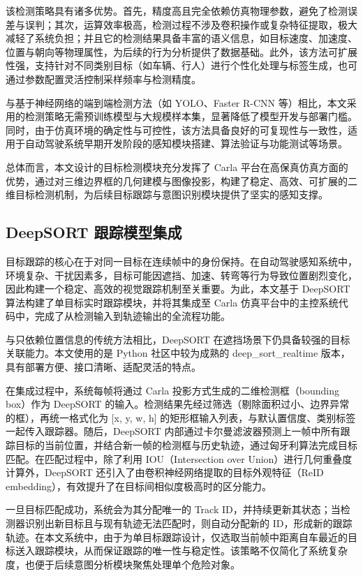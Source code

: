 该检测策略具有诸多优势。首先，精度高且完全依赖仿真物理参数，避免了检测误差与误判；其次，运算效率极高，检测过程不涉及卷积操作或复杂特征提取，极大减轻了系统负担；并且它的检测结果具备丰富的语义信息，如目标速度、加速度、位置与朝向等物理属性，为后续的行为分析提供了数据基础。此外，该方法可扩展性强，支持针对不同类别目标（如车辆、行人）进行个性化处理与标签生成，也可通过参数配置灵活控制采样频率与检测精度。

与基于神经网络的端到端检测方法（如 YOLO、Faster R-CNN 等）相比，本文采用的检测策略无需预训练模型与大规模样本集，显著降低了模型开发与部署门槛。同时，由于仿真环境的确定性与可控性，该方法具备良好的可复现性与一致性，适用于自动驾驶系统早期开发阶段的感知模块搭建、算法验证与功能测试等场景。

总体而言，本文设计的目标检测模块充分发挥了 Carla 平台在高保真仿真方面的优势，通过对三维边界框的几何建模与图像投影，构建了稳定、高效、可扩展的二维目标检测机制，为后续目标跟踪与意图识别模块提供了坚实的感知支撑。

\subsection{DeepSORT 跟踪模型集成}

目标跟踪的核心在于对同一目标在连续帧中的身份保持。在自动驾驶感知系统中，环境复杂、干扰因素多，目标可能因遮挡、加速、转弯等行为导致位置剧烈变化，因此构建一个稳定、高效的视觉跟踪机制至关重要。为此，本文基于 DeepSORT 算法构建了单目标实时跟踪模块，并将其集成至 Carla 仿真平台中的主控系统代码中，完成了从检测输入到轨迹输出的全流程功能。

与只依赖位置信息的传统方法相比，DeepSORT 在遮挡场景下仍具备较强的目标关联能力。本文使用的是 Python 社区中较为成熟的 deep\_sort\_realtime 版本，具有部署方便、接口清晰、适配灵活的特点。

在集成过程中，系统每帧将通过 Carla 投影方式生成的二维检测框（bounding box）作为 DeepSORT 的输入。检测结果先经过筛选（剔除面积过小、边界异常的框），再统一格式化为 [x, y, w, h] 的矩形框输入列表，与默认置信度、类别标签一起传入跟踪器。随后，DeepSORT 内部通过卡尔曼滤波器预测上一帧中所有跟踪目标的当前位置，并结合新一帧的检测框与历史轨迹，通过匈牙利算法完成目标匹配。在匹配过程中，除了利用 IOU（Intersection over Union）进行几何重叠度计算外，DeepSORT 还引入了由卷积神经网络提取的目标外观特征（ReID embedding），有效提升了在目标间相似度极高时的区分能力。

一旦目标匹配成功，系统会为其分配唯一的 Track ID，并持续更新其状态；当检测器识别出新目标且与现有轨迹无法匹配时，则自动分配新的 ID，形成新的跟踪轨迹。在本文系统中，由于为单目标跟踪设计，仅选取当前帧中距离自车最近的目标送入跟踪模块，从而保证跟踪的唯一性与稳定性。该策略不仅简化了系统复杂度，也便于后续意图分析模块聚焦处理单个危险对象。

